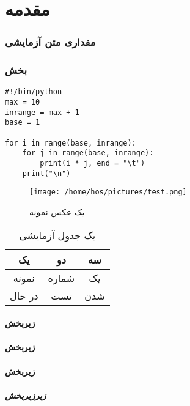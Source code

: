 \part{مقدمه}
\section{مقداری متن آزمایشی}

\ptext[5]

\section{بخش}

\begin{src}[نمونه]
\begin{verbatim}
#!/bin/python
max = 10
inrange = max + 1
base = 1

for i in range(base, inrange):
	for j in range(base, inrange):
		print(i * j, end = "\t")
	print("\n")
\end{verbatim}
\end{src}

\begin{figure}[ht!]
	\centering
	\caption{یک عکس نمونه}
	\texttt{[image: /home/hos/pictures/test.png]}
\end{figure}

\begin{table}[ht!]
	\centering
	\begin{tabular}{ccc}
		\hline
		\textbf{یک} & \textbf{دو} & \textbf{سه} \\
		\hline
		نمونه & شماره & یک \\
		در حال & تست & شدن \\
		\hline
	\end{tabular}
	\caption{یک جدول آزمایشی}
\end{table}

\subsection{زیربخش}
\subsection{زیربخش}
\subsection{زیربخش}
\subsubsection{زیرزیربخش}
